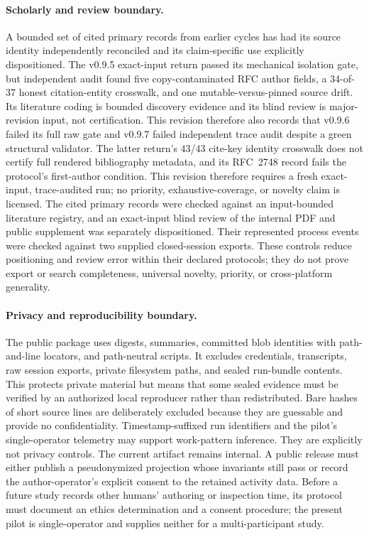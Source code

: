 \documentclass[11pt]{article}
\begin{document}
\paragraph{Scholarly and review boundary.}
\ifdefined\InternalBuild
A bounded set of cited primary records from earlier cycles has had its source
identity independently reconciled and its claim-specific use explicitly
dispositioned. The v0.9.5 exact-input return passed its mechanical isolation
gate, but independent audit found five copy-contaminated RFC author fields, a
34-of-37 honest citation-entity crosswalk, and one mutable-versus-pinned source
drift. Its literature coding is bounded discovery evidence and its blind
review is major-revision input, not certification. This revision therefore
also records that v0.9.6 failed its full raw gate and v0.9.7 failed independent
trace audit despite a green structural validator. The latter return's 43/43
cite-key identity crosswalk does not certify full rendered bibliography
metadata, and its RFC~2748 record fails the protocol's first-author condition.
This revision therefore requires a fresh exact-input, trace-audited run; no
priority, exhaustive-coverage, or novelty claim is licensed.
\else
  \ifdefined\VerifiedLiterature
    The cited primary records were checked against an input-bounded literature
    registry, and an exact-input blind review of the internal PDF and public
    supplement was separately dispositioned. Their represented process events
    were checked against two supplied closed-session exports. These controls
    reduce positioning and review error within their declared protocols; they
    do not prove export or search completeness, universal novelty, priority, or
    cross-platform generality.
  \else
    \PackageError{agent-graph-runtime}{Missing publication mode}{%
      Build with build.py in internal or release mode.%
    }%
  \fi
\fi

\paragraph{Privacy and reproducibility boundary.}
The public package uses digests, summaries, committed blob identities with
path-and-line locators, and
path-neutral scripts.  It excludes credentials, transcripts, raw session
exports, private filesystem paths, and sealed run-bundle contents.  This
protects private material but means that some sealed evidence must be verified
by an authorized local reproducer rather than redistributed. Bare hashes of
short source lines are deliberately excluded because they are guessable and
provide no confidentiality. Timestamp-suffixed run identifiers and the pilot's
single-operator telemetry may support work-pattern inference. They are
explicitly not privacy controls. The current artifact remains internal. A
public release must either publish a pseudonymized projection whose invariants
still pass or record the author-operator's explicit consent to the retained
activity data. Before a future study records other humans' authoring or
inspection time, its protocol must document an ethics determination and a
consent procedure; the present pilot is single-operator and supplies neither
for a multi-participant study.
\end{document}
